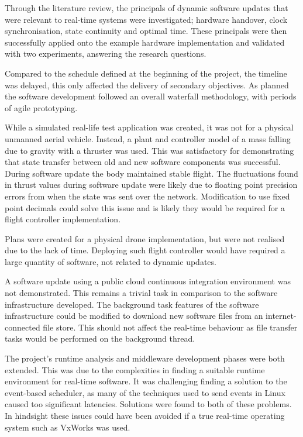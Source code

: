 Through the literature review, the principals of dynamic software updates that were relevant to real-time systems were investigated; hardware handover, clock synchronisation, state continuity and optimal time. These principals were then successfully applied onto the example hardware implementation and validated with two experiments, answering the research questions.


Compared to the schedule defined at the beginning of the project, the timeline was delayed, this only affected the delivery of secondary objectives. As planned the software development followed an overall waterfall methodology, with periods of agile prototyping.

While a simulated real-life test application was created, it was not for a physical unmanned aerial vehicle. Instead, a plant and controller model of a mass falling due to gravity with a thruster was used. This was satisfactory for demonstrating that state transfer between old and new software components was successful. During software update the body maintained stable flight. The fluctuations found in thrust values during software update were likely due to floating point precision errors from when the state was sent over the network. Modification to use fixed point decimals could solve this issue and is likely they would be required for a flight controller implementation.

Plans were created for a physical drone implementation, but were not realised due to the lack of time. Deploying such flight controller would have required a large quantity of software, not related to dynamic updates. 

A software update using a public cloud continuous integration environment was not demonstrated. This remains a trivial task in comparison to the software infrastructure developed. The background task features of the software infrastructure could be modified to download new software files from an internet-connected file store. This should not affect the real-time behaviour as file transfer tasks would be performed on the background thread.


The project's runtime analysis and middleware development phases were both extended. This was due to the complexities in finding a suitable runtime environment for real-time software. It was challenging finding a solution to the event-based scheduler, as many of the techniques used to send events in Linux caused too significant latencies. Solutions were found to both of these problems. In hindsight these issues could have been avoided if a true real-time operating system such as VxWorks was used.

